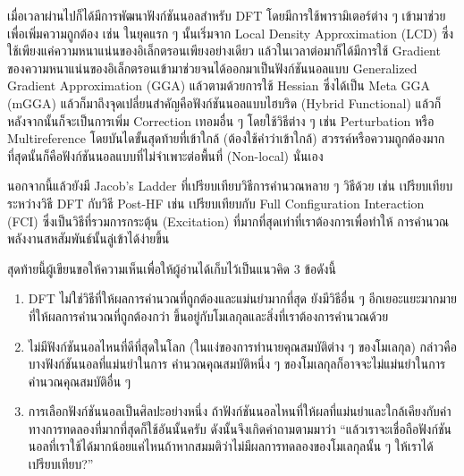 เมื่อเวลาผ่านไปก็ได้มีการพัฒนาฟังก์ชันนอลสำหรับ DFT โดยมีการใช้พารามิเตอร์ต่าง ๆ เข้ามาช่วยเพื่อเพิ่มความถูกต้อง เช่น ในยุคแรก ๆ นั้นเริ่มจาก
Local Density Approximation (LCD) ซึ่งใช้เพียงแค่ความหนาแน่นของอิเล็กตรอนเพียงอย่างเดียว แล้วในเวลาต่อมาก็ได้มีการใช้ Gradient
ของความหนาแน่นของอิเล็กตรอนเข้ามาช่วยจนได้ออกมาเป็นฟังก์ชันนอลแบบ Generalized Gradient Approximation (GGA)\autocite{perdew1996}
แล้วตามด้วยการใช้ Hessian ซึ่งได้เป็น Meta GGA (mGGA) แล้วก็มาถึงจุดเปลี่ยนสำคัญคือฟังก์ชันนอลแบบไฮบริด (Hybrid Functional)
แล้วก็หลังจากนั้นก็จะเป็นการเพิ่ม Correction เทอมอื่น ๆ โดยใช้วิธีต่าง ๆ เช่น Perturbation หรือ Multireference โดยบันไดขั้นสุดท้ายที่เข้าใกล้
(ต้องใช้คำว่าเข้าใกล้) สวรรค์หรือความถูกต้องมากที่สุดนั้นก็คือฟังก์ชันนอลแบบที่ไม่จำเพาะต่อพื้นที่ (Non-local) นั่นเอง

นอกจากนี้แล้วยังมี Jacob's Ladder ที่เปรียบเทียบวิธีการคำนวณหลาย ๆ วิธีด้วย เช่น เปรียบเทียบระหว่างวิธี DFT กับวิธี Post-HF เช่น
เปรียบเทียบกับ Full Configuration Interaction (FCI) ซึ่งเป็นวิธีที่รวมการกระตุ้น (Excitation) ที่มากที่สุดเท่าที่เราต้องการเพื่อทำให้%
การคำนวณพลังงานสหสัมพันธ์นั้นลู่เข้าได้ง่ายขึ้น

สุดท้ายนี้ผู้เขียนขอให้ความเห็นเพื่อให้ผู้อ่านได้เก็บไว้เป็นแนวคิด 3 ข้อดังนี้

\begin{enumerate}[topsep=0pt]
    \item DFT ไม่ใช่วิธีที่ให้ผลการคำนวณที่ถูกต้องและแม่นยำมากที่สุด ยังมีวิธีอื่น ๆ อีกเยอะแยะมากมายที่ให้ผลการคำนวณที่ถูกต้องกว่า
          ขึ้นอยู่กับโมเลกุลและสิ่งที่เราต้องการคำนวณด้วย

    \item ไม่มีฟังก์ชันนอลไหนที่ดีที่สุดในโลก (ในแง่ของการทำนายคุณสมบัติต่าง ๆ ของโมเลกุล) กล่าวคือบางฟังก์ชันนอลที่แม่นยำในการ%
          คำนวณคุณสมบัติหนึ่ง ๆ ของโมเลกุลก็อาจจะไม่แม่นยำในการคำนวณคุณสมบัติอื่น ๆ

    \item การเลือกฟังก์ชันนอลเป็นศิลปะอย่างหนึ่ง ถ้าฟังก์ชันนอลไหนที่ให้ผลที่แม่นยำและใกล้เคียงกับค่าทางการทดลองที่มากที่สุดก็ใช้อันนั้นครับ
          ดังนั้นจึงเกิดคำถามตามมาว่า \enquote{แล้วเราจะเชื่อถือฟังก์ชันนอลที่เราใช้ได้มากน้อยแค่ไหนถ้าหากสมมติว่าไม่มีผลการทดลองของโมเลกุลนั้น ๆ
              ให้เราได้เปรียบเทียบ?}
\end{enumerate}

